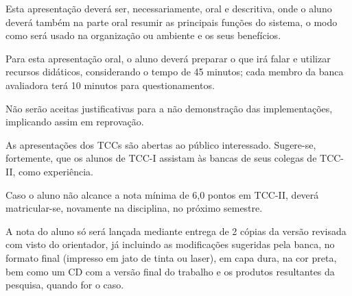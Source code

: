 Esta apresenta\c{c}\~{a}o dever\'{a} ser, necessariamente, oral e descritiva, onde o aluno dever\'{a} tamb\'{e}m na parte oral resumir as principais fun\c{c}\~{o}es do sistema, o modo como ser\'{a} usado na organiza\c{c}\~{a}o ou ambiente e os seus benef\'{i}cios.

Para esta apresenta\c{c}\~{a}o oral, o aluno dever\'{a} preparar o que ir\'{a} falar e utilizar recursos did\'{a}ticos, considerando o tempo de 45 minutos; cada membro da banca avaliadora ter\'{a} 10 minutos para questionamentos.

N\~{a}o ser\~{a}o aceitas justificativas para a n\~{a}o demonstra\c{c}\~{a}o das implementa\c{c}\~{o}es, implicando assim em reprova\c{c}\~{a}o.

As apresenta\c{c}\~{o}es dos TCCs s\~{a}o abertas ao p\'{u}blico interessado. Sugere-se, fortemente, que os alunos de TCC-I assistam \`{a}s bancas de seus colegas de TCC-II, como experi\^{e}ncia.

Caso o aluno n\~{a}o alcance a nota m\'{i}nima de 6,0 pontos em TCC-II, dever\'{a} matricular-se, novamente na disciplina, no pr\'{o}ximo semestre.
	
A nota do aluno s\'{o} ser\'{a} lan\c{c}ada mediante entrega de 2 c\'{o}pias da vers\~{a}o revisada com visto do orientador, j\'{a} incluindo as modifica\c{c}\~{o}es sugeridas pela banca, no formato final (impresso em jato de tinta ou laser), em capa dura, na cor preta, bem como um CD com a vers\~{a}o final do trabalho e os produtos resultantes da pesquisa, quando for o caso.

	
